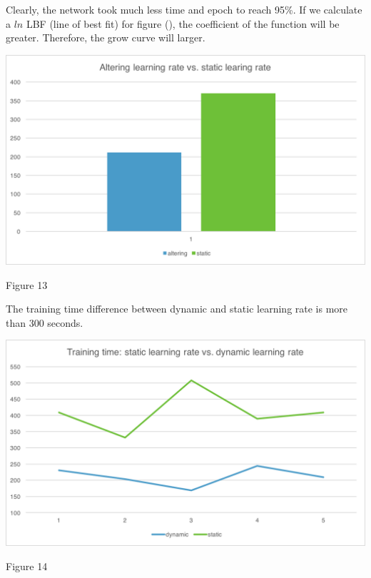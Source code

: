 \documentclass[]{article}
\begin{document}
\begin{multicols}{2}
Clearly, the network took much less time and epoch to reach 95\%. If we calculate a \(ln\) LBF (line of best fit) for figure (), the coefficient of the function will be greater.  Therefore, the grow curve will larger.   

\centerline{\includegraphics[width=1\linewidth]{graph10} }
\centerline{Figure 13}
\vspace{0.5cm}

The training time difference between dynamic and static learning rate is more than 300 seconds. 

\centerline{\includegraphics[width=1\linewidth]{graph11} }
\centerline{Figure 14}
\vspace{0.5cm}

\end{multicols}
\end{document}
